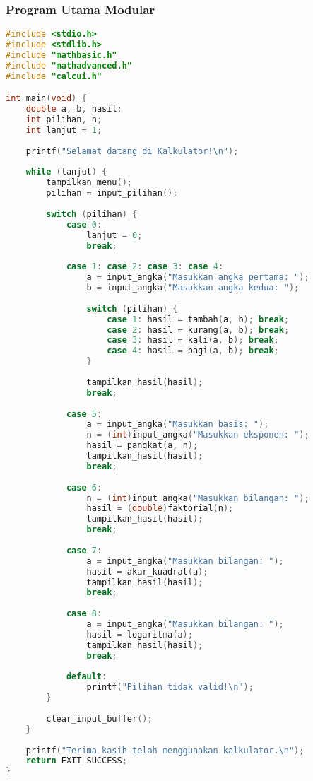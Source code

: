 \documentclass[../main.tex]{subfiles}
\begin{document}
\subsubsection{Program Utama Modular}
\begin{lstlisting}[language=C, caption={kalkulator.c - program utama}]
#include <stdio.h>
#include <stdlib.h>
#include "mathbasic.h"
#include "mathadvanced.h"
#include "calcui.h"

int main(void) {
    double a, b, hasil;
    int pilihan, n;
    int lanjut = 1;
    
    printf("Selamat datang di Kalkulator!\n");
    
    while (lanjut) {
        tampilkan_menu();
        pilihan = input_pilihan();
        
        switch (pilihan) {
            case 0:
                lanjut = 0;
                break;
                
            case 1: case 2: case 3: case 4:
                a = input_angka("Masukkan angka pertama: ");
                b = input_angka("Masukkan angka kedua: ");
                
                switch (pilihan) {
                    case 1: hasil = tambah(a, b); break;
                    case 2: hasil = kurang(a, b); break;
                    case 3: hasil = kali(a, b); break;
                    case 4: hasil = bagi(a, b); break;
                }
                
                tampilkan_hasil(hasil);
                break;
                
            case 5:
                a = input_angka("Masukkan basis: ");
                n = (int)input_angka("Masukkan eksponen: ");
                hasil = pangkat(a, n);
                tampilkan_hasil(hasil);
                break;
                
            case 6:
                n = (int)input_angka("Masukkan bilangan: ");
                hasil = (double)faktorial(n);
                tampilkan_hasil(hasil);
                break;
                
            case 7:
                a = input_angka("Masukkan bilangan: ");
                hasil = akar_kuadrat(a);
                tampilkan_hasil(hasil);
                break;
                
            case 8:
                a = input_angka("Masukkan bilangan: ");
                hasil = logaritma(a);
                tampilkan_hasil(hasil);
                break;
                
            default:
                printf("Pilihan tidak valid!\n");
        }
        
        clear_input_buffer();
    }
    
    printf("Terima kasih telah menggunakan kalkulator.\n");
    return EXIT_SUCCESS;
}
\end{lstlisting}
\end{document}
